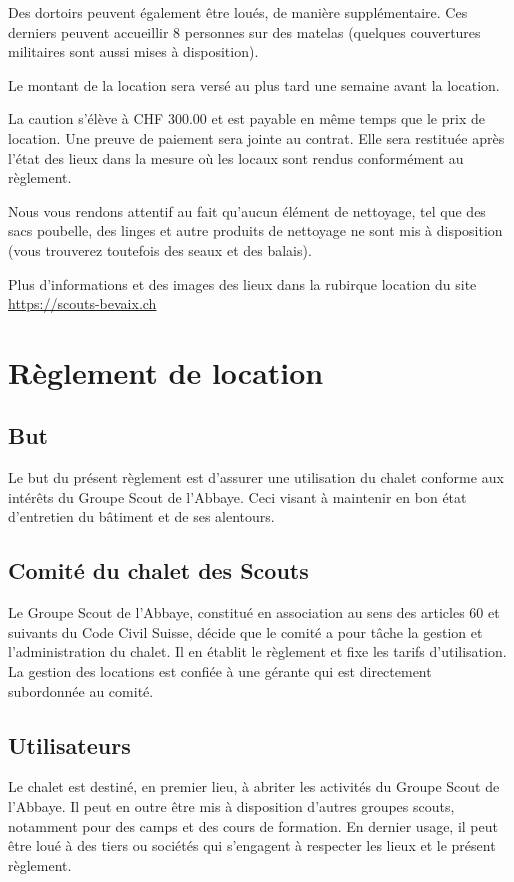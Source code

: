 \documentclass[a4paper,12pt]{extarticle}
\begin{document}
Des dortoirs peuvent également être loués, de manière supplémentaire.
Ces derniers peuvent accueillir 8 personnes sur des matelas (quelques couvertures militaires sont aussi mises à disposition).

Le montant de la location sera versé au plus tard une semaine avant la location.

La caution s'élève à CHF 300.00 et est payable en même temps que le prix de location. Une preuve de paiement sera jointe au contrat. Elle sera restituée après l'état des lieux dans la mesure où les locaux sont rendus conformément au règlement. 

Nous vous rendons attentif au fait qu'aucun élément de nettoyage, tel que des sacs poubelle, des linges et autre produits de nettoyage ne sont mis à disposition (vous trouverez toutefois des seaux et des balais).

Plus d'informations et des images des lieux dans la rubirque location du site \url{https://scouts-bevaix.ch}

\newpage

\section{Règlement de location \label{sec:contract}}

\subsection{But}
Le but du présent règlement est d'assurer une utilisation du chalet conforme aux intérêts du Groupe Scout de l'Abbaye.
Ceci visant à maintenir en bon état d'entretien du bâtiment et de ses alentours.

\subsection{Comité du chalet des Scouts}

Le Groupe Scout de l'Abbaye, constitué en association au sens des articles 60 et suivants du Code Civil Suisse, décide que le comité a pour tâche la gestion et l'administration du chalet. Il en établit le règlement et fixe les tarifs d'utilisation.
La gestion des locations est confiée à une gérante qui est directement subordonnée au comité.

\subsection{Utilisateurs}
Le chalet est destiné, en premier lieu, à abriter les activités du Groupe Scout de l'Abbaye.
Il peut en outre être mis à disposition d'autres groupes scouts, notamment pour des camps et des cours de formation. En dernier usage, il peut être loué à des tiers ou sociétés qui s'engagent à respecter les lieux et le présent règlement.
\end{document}
